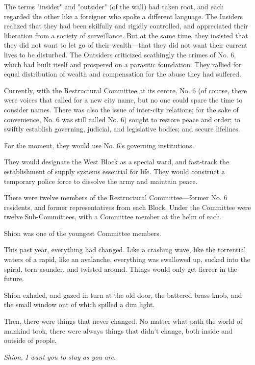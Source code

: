 The terms "insider" and "outsider" (of the wall) had taken root, and
each regarded the other like a foreigner who spoke a different language.
The Insiders realized that they had been skilfully and rigidly
controlled, and appreciated their liberation from a society of
surveillance. But at the same time, they insisted that they did not want
to let go of their wealth---that they did not want their current lives to
be disturbed. The Outsiders criticized scathingly the crimes of No. 6,
which had built itself and prospered on a parasitic foundation. They
rallied for equal distribution of wealth and compensation for the abuse
they had suffered.

Currently, with the Restructural Committee at its centre, No. 6 (of
course, there were voices that called for a new city name, but no one
could spare the time to consider names. There was also the issue of
inter-city relations; for the sake of convenience, No. 6 was still
called No. 6) sought to restore peace and order; to swiftly establish
governing, judicial, and legislative bodies; and secure lifelines.

For the moment, they would use No. 6's governing institutions.

They would designate the West Block as a special ward, and fast-track
the establishment of supply systems essential for life. They would
construct a temporary police force to dissolve the army and maintain
peace.

There were twelve members of the Restructural
Committee---former No. 6 residents, and former representatives from each
Block. Under the Committee were twelve Sub-Committees, with a Committee
member at the helm of each.

Shion was one of the youngest Committee members.

This past year, everything had changed. Like a crashing wave, like the
torrential waters of a rapid, like an avalanche, everything was
swallowed up, sucked into the spiral, torn asunder, and twisted around.
Things would only get fiercer in the future.

Shion exhaled, and gazed in turn at the old door, the battered brass
knob, and the small window out of which spilled a dim light.

Then, there were things that never changed. No matter what path the
world of mankind took, there were always things that didn't change, both
inside and outside of people.

\emph{Shion, I want you to stay as you are.}

